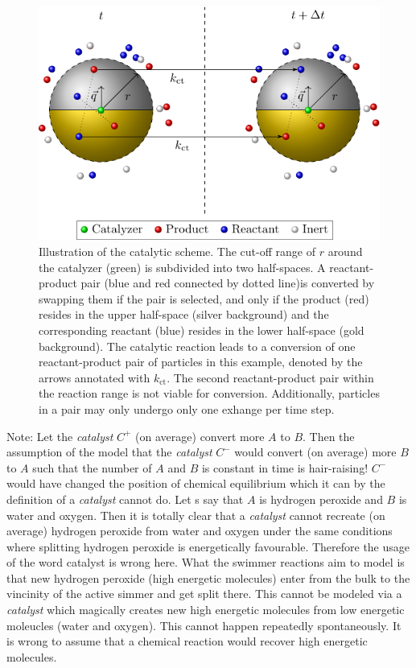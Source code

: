 \documentclass[aip,jcp,reprint,a4paper,onecolumn,nofootinbib,amsmath,amssymb]{revtex4-1}
\begin{document}
\begin{figure}
  \centering
  \includegraphics{FIGURES/number-conserving}
  \caption{\label{fig:nc}Illustration of the catalytic scheme. The cut-off range of $r$ around the catalyzer (green) is subdivided into two half-spaces. A reactant-product pair (blue and red connected by dotted line)is converted by swapping them if the pair is selected, and only if the product (red) resides in the upper half-space (silver background) and the corresponding reactant (blue) resides in the lower half-space (gold background). The catalytic reaction leads to a conversion of one reactant-product pair of particles in this example, denoted by the arrows annotated with $k_{\text{ct}}$. The second reactant-product pair within the reaction range is not viable for conversion. Additionally, particles in a pair may only undergo only one exhange per time step.}
\end{figure}

Note: Let the \textit{catalyst} $C^{+}$ (on average) convert more $A$ to $B$. Then the assumption of the model that the \textit{catalyst} $C^{-}$ would convert (on average) more $B$ to $A$ such that the number of $A$ and $B$ is constant in time is hair-raising! $C^{-}$ would have changed the position of chemical equilibrium which it can by the definition of a \textit{catalyst} cannot do. Let s say that $A$ is hydrogen peroxide and $B$ is water and oxygen. Then it is totally clear that a \textit{catalyst} cannot recreate (on average) hydrogen peroxide from water and oxygen under the same conditions where splitting hydrogen peroxide is energetically favourable. Therefore the usage of the word catalyst is wrong here. What the swimmer reactions aim to model is that new hydrogen peroxide (high energetic molecules) enter from the bulk to the vincinity of the active simmer and get split there. This cannot be modeled via a \textit{catalyst} which magically creates new high energetic molecules from low energetic moleucles (water and oxygen). This cannot happen repeatedly spontaneously. It is wrong to assume that a chemical reaction would recover high energetic molecules.
\end{document}
